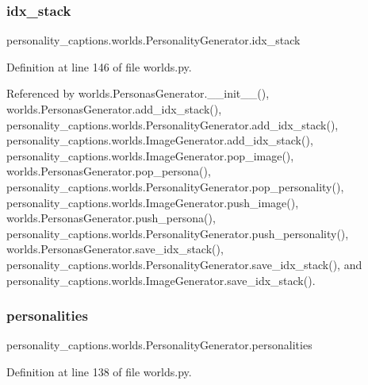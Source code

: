\subsubsection{\texorpdfstring{idx\+\_\+stack}{idx\_stack}}
{\footnotesize\ttfamily personality\+\_\+captions.\+worlds.\+Personality\+Generator.\+idx\+\_\+stack}



Definition at line 146 of file worlds.\+py.



Referenced by worlds.\+Personas\+Generator.\+\_\+\+\_\+init\+\_\+\+\_\+(), worlds.\+Personas\+Generator.\+add\+\_\+idx\+\_\+stack(), personality\+\_\+captions.\+worlds.\+Personality\+Generator.\+add\+\_\+idx\+\_\+stack(), personality\+\_\+captions.\+worlds.\+Image\+Generator.\+add\+\_\+idx\+\_\+stack(), personality\+\_\+captions.\+worlds.\+Image\+Generator.\+pop\+\_\+image(), worlds.\+Personas\+Generator.\+pop\+\_\+persona(), personality\+\_\+captions.\+worlds.\+Personality\+Generator.\+pop\+\_\+personality(), personality\+\_\+captions.\+worlds.\+Image\+Generator.\+push\+\_\+image(), worlds.\+Personas\+Generator.\+push\+\_\+persona(), personality\+\_\+captions.\+worlds.\+Personality\+Generator.\+push\+\_\+personality(), worlds.\+Personas\+Generator.\+save\+\_\+idx\+\_\+stack(), personality\+\_\+captions.\+worlds.\+Personality\+Generator.\+save\+\_\+idx\+\_\+stack(), and personality\+\_\+captions.\+worlds.\+Image\+Generator.\+save\+\_\+idx\+\_\+stack().

\mbox{\label{classpersonality__captions_1_1worlds_1_1PersonalityGenerator_ad2e42bbbde55a18a9c10477bc5ac4b02}} 
\subsubsection{\texorpdfstring{personalities}{personalities}}
{\footnotesize\ttfamily personality\+\_\+captions.\+worlds.\+Personality\+Generator.\+personalities}



Definition at line 138 of file worlds.\+py.




